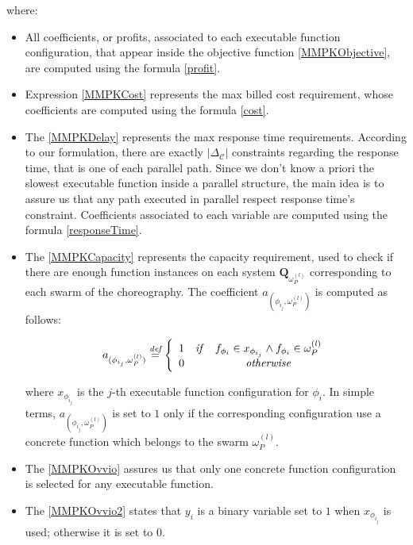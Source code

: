 \documentclass[12pt,a4paper]{report}
\newcommand{\mathDef}{\overset{\textit{def}}{=}}
\begin{document}
where:

\begin{itemize}
	\item All coefficients, or profits, associated to each executable function configuration, that appear inside the objective function \ref{MMPKObjective}, are computed using the formula \ref{profit}.
	
	\item Expression \ref{MMPKCost} represents the max billed cost requirement, whose coefficients are computed using the formula \ref{cost}. 
	
    \item The \ref{MMPKDelay} represents the max response time requirements. According to our formulation, there are exactly $|\Delta_{\mathcal{C}}|$ constraints regarding the response time, that is one of each parallel path. Since we don't know a priori the slowest executable function inside a parallel structure, the main idea is to assure us that any path executed in parallel respect response time's constraint. Coefficients associated to each variable are computed using the formula \ref{responseTime}.
    
    \item The \ref{MMPKCapacity} represents the capacity requirement, used to check if there are enough function instances on each system $\textbf{Q}_{\omega_{P}^{(l)}}$ corresponding to each swarm of the choreography. The coefficient $a_{(\phi_{i_{j}},\omega_{P}^{(l)})}$ is computed as follows:
    
    \begin{equation}	
    	a_{(\phi_{i_{j}},\omega_{P}^{(l)})} \mathDef \left\{
    	\begin{array}{lcc}
    		1 & \text{\textit{if}} & f_{\phi_i} \in x_{\phi_{i_j}} \wedge f_{\phi_i} \in \omega_{P}^{(l)} \\ 
    		0 & & \text{\textit{otherwise}} \\
    	\end{array} \right.
    \end{equation}
    
	where $x_{\phi_{i_j}}$ is the $j$-th executable function configuration for $\phi_i$. In simple terms, $a_{(\phi_{i_{j}},\omega_{P}^{(l)})}$ is set to $1$ only if the corresponding configuration use a concrete function which belongs to the swarm $\omega_{P}^{(l)}$.
	
	\item The \ref{MMPKOvvio} assures us that only one concrete function configuration is selected for any executable function. 
	
	\item The \ref{MMPKOvvio2} states that $y_i$ is a binary variable set to $1$ when $x_{\phi_{i_j}}$ is used; otherwise it is set to $0$.
	
\end{itemize}
\end{document}

